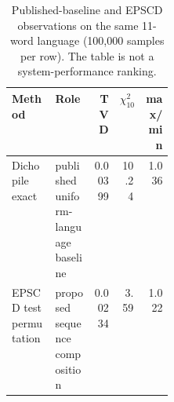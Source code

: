 \begin{table}[t]
\centering
\small
\setlength{\tabcolsep}{3pt}
\caption{Published-baseline and EPSCD observations on the same 11-word language
(100,000 samples per row). The table is not a system-performance ranking.}
\label{tab:dist}
\begin{tabular}{lR{0.24\linewidth}rrr}
\toprule
Method & Role & TVD & $\chi^2_{10}$ & max/min \\
\midrule
Dichopile exact~\cite{oudinet2013uniform} & published uniform-language baseline & 0.00399 & 10.24 & 1.036 \\
EPSCD test permutation & proposed sequence composition & 0.00234 & 3.59 & 1.022 \\
\bottomrule
\end{tabular}
\end{table}
